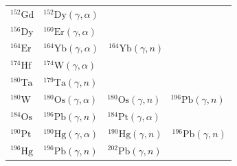 \begin{table}
\begin{tabular}{l|l}
    $^{152}\mathrm{Gd}$ & $^{152}\mathrm{Dy}(\gamma,\alpha)$ \\
    $^{156}\mathrm{Dy}$ & $^{160}\mathrm{Er}(\gamma,\alpha)$ \\
    $^{164}\mathrm{Er}$ & $^{164}\mathrm{Yb}(\gamma,\alpha)$~~$^{164}\mathrm{Yb}(\gamma,n)$ \\
    $^{174}\mathrm{Hf}$ & $^{174}\mathrm{W}(\gamma,\alpha)$ \\
    $^{180}\mathrm{Ta}$ & $^{179}\mathrm{Ta}(\gamma,n)$ \\
    $^{180}\mathrm{W}$ & $^{180}\mathrm{Os}(\gamma,\alpha)$~~$^{180}\mathrm{Os}(\gamma,n)$~~$^{196}\mathrm{Pb}(\gamma,n)$ \\
    $^{184}\mathrm{Os}$ & $^{196}\mathrm{Pb}(\gamma,n)$~~$^{184}\mathrm{Pt}(\gamma,\alpha)$ \\
    $^{190}\mathrm{Pt}$ & $^{190}\mathrm{Hg}(\gamma,\alpha)$~~$^{190}\mathrm{Hg}(\gamma,n)$~~$^{196}\mathrm{Pb}(\gamma,n)$ \\
    $^{196}\mathrm{Hg}$ & $^{196}\mathrm{Pb}(\gamma,n)$~~$^{202}\mathrm{Pb}(\gamma,n)$ \\
    \toprule
    \end{tabular}
\end{table}

